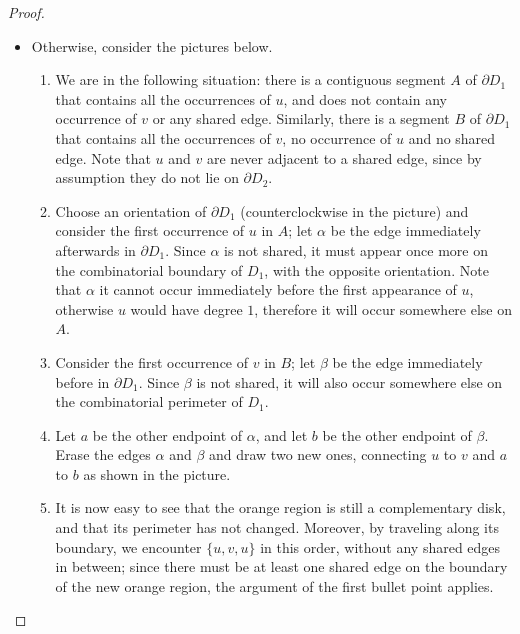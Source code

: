 \begin{proof}
\begin{itemize}
\begin{center}
\end{center}
\item Otherwise, consider the pictures below.
\begin{enumerate}[(1)]
\item We are in the following situation: there is a contiguous segment $A$ of $\partial D_1$ that contains all the occurrences of $u$, and does not contain any occurrence of $v$ or any shared edge. Similarly, there is a segment $B$ of $\partial D_1$ that contains all the occurrences of $v$, no occurrence of $u$ and no shared edge. Note that $u$ and $v$ are never adjacent to a shared edge, since by assumption they do not lie on $\partial D_2$.
\item Choose an orientation of $\partial D_1$ (counterclockwise in the picture) and consider the first occurrence of $u$ in $A$; let $\alpha$ be the edge immediately afterwards in $\partial D_1$. Since $\alpha$ is not shared, it must appear once more on the combinatorial boundary of $D_1$, with the opposite orientation. Note that $\alpha$ it cannot occur immediately before the first appearance of $u$, otherwise $u$ would have degree $1$, therefore it will occur somewhere else on $A$.
\item Consider the first occurrence of $v$ in $B$; let $\beta$ be the edge immediately before in $\partial D_1$. Since $\beta$ is not shared, it will also occur somewhere else on the combinatorial perimeter of $D_1$.
\item Let $a$ be the other endpoint of $\alpha$, and let $b$ be the other endpoint of $\beta$. Erase the edges $\alpha$ and $\beta$ and draw two new ones, connecting $u$ to $v$ and $a$ to $b$ as shown in the picture.
\item It is now easy to see that the orange region is still a complementary disk, and that its perimeter has not changed. Moreover, by traveling along its boundary, we encounter $\{u,v,u\}$ in this order, without any shared edges in between; since there must be at least one shared edge on the boundary of the new orange region, the argument of the first bullet point applies.

\end{enumerate}
\end{itemize}
\end{proof}

